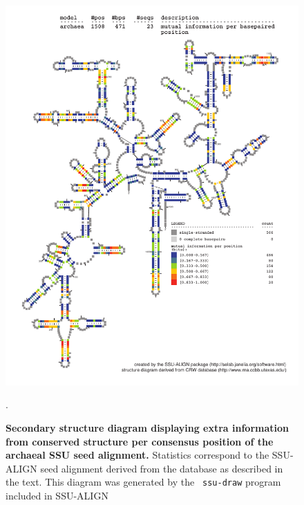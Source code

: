 \begin{figure}
\begin{center}
\includegraphics[width=5.7in]{Figures/archaea-0p1-mutinfo}
\end{center}
\caption[Secondary structure diagram displaying extra information 
  from conserved structure per consensus position of the archaeal SSU seed
  alignment]{\textbf{Secondary structure diagram displaying extra
  information from conserved structure per consensus position of the archaeal SSU seed
  alignment.} Statistics correspond to the SSU-ALIGN seed
  alignment derived from the  database \cite{CannoneGutell02}
  as described in the text. This diagram was generated by the {\tt
  ssu-draw} program included in SSU-ALIGN}.
\label{fig:arcsinfo}
\end{figure}

\newpage 

